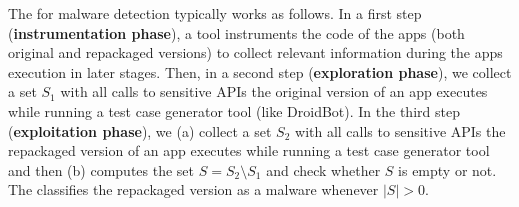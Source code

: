 The \mas for malware detection typically works as follows. In a first step ({\bf instrumentation phase}), 
a tool instruments the code of the apps (both original and repackaged versions) to collect relevant information
during the apps execution in later stages. Then, in a second step ({\bf exploration phase}),
we collect a set $S_1$ with all calls to sensitive APIs the original version of an app executes while running a test case generator tool (like DroidBot).
In the third step ({\bf exploitation phase}), we (a) collect a set $S_2$ with all calls to sensitive APIs the repackaged version of an app
executes while running a test case generator tool and then (b) computes the set $S = S_2 \setminus S_1$ and check whether  $S$ is empty or not.
The \mas classifies the repackaged version as a malware whenever $|S| > 0$.  




